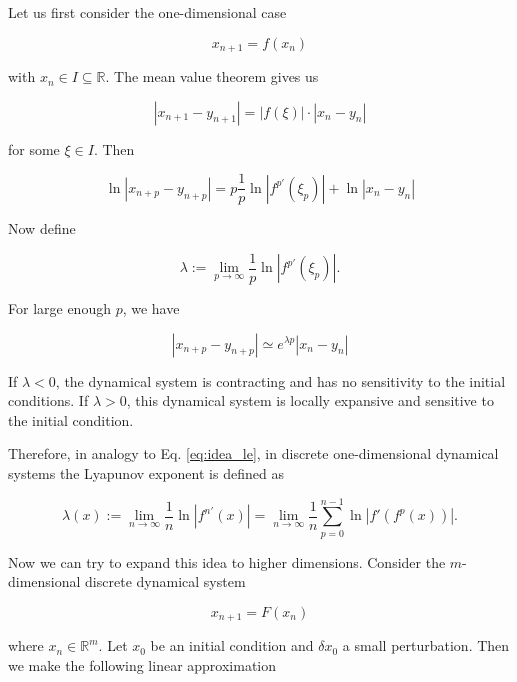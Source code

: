 Let us first consider the one-dimensional case 

\begin{equation*}
    x_{n+1} = f(x_n)
\end{equation*}

with $x_n\in I \subseteq \mathbb{R}$. The mean value theorem gives us 

\begin{equation}
    |x_{n+1} - y_{n+1}| = |f(\xi)| \cdot |x_n - y_n|
\end{equation}

for some $\xi \in I$. Then 

\begin{equation}
    \ln|x_{n+p} - y_{n+p}| = p \frac{1}{p} \ln|f^{p'}(\xi_p)| + \ln|x_n - y_n|
\end{equation}

Now define 

\begin{equation}
    \lambda := \lim_{p\rightarrow \infty} \frac{1}{p} \ln|f^{p'}(\xi_p)|.
    \label{eq:idea_le}
\end{equation}

For large enough $p$, we have

\begin{equation}
    |x_{n+p} - y_{n+p}| \simeq e^{\lambda p} |x_n - y_n|
\end{equation}

If $\lambda < 0$, the dynamical system is contracting and has no sensitivity to the initial conditions. If $\lambda > 0$, this dynamical system is locally expansive
and sensitive to the initial condition.

Therefore, in analogy to Eq. \ref{eq:idea_le}, in discrete one-dimensional dynamical systems the Lyapunov exponent is defined as 

\begin{equation}
    \lambda(x) := \lim_{n \rightarrow \infty} \frac{1}{n} \ln |f^{n'}(x)| = \lim_{n \rightarrow \infty} \frac{1}{n} \sum_{p=0}^{n-1} \ln |f'\left( f^p(x)\right) |.
\end{equation}

Now we can try to expand this idea to higher dimensions. Consider the $m$-dimensional discrete dynamical system

\begin{equation}
    x_{n+1} = F(x_n)
\end{equation}

where $x_n \in \mathbb{R}^m$. Let $x_0$ be an initial condition and $\delta x_0$ a small perturbation. Then we make the following linear approximation


